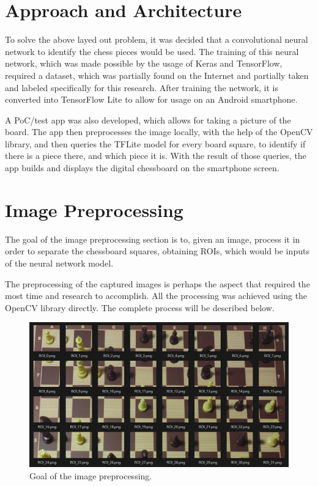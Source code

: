 \documentclass[10pt]{article}
\begin{document}
\pagebreak

\section{Approach and Architecture}\label{sec:2}

To solve the above layed out problem, it was decided that a convolutional neural network to identify the chess pieces would be used. The training of this neural network, which was made possible by the usage of Keras and TensorFlow, required a dataset, which was partially found on the Internet and partially taken and labeled specifically for this research. After training the network, it is converted into TensorFlow Lite to allow for usage on an Android smartphone.

A PoC/test app was also developed, which allows for taking a picture of the board. The app then preprocesses the image locally, with the help of the OpenCV library, and then queries the TFLite model for every board square, to identify if there is a piece there, and which piece it is. With the result of those queries, the app builds and displays the digital chessboard on the smartphone screen.

\section{Image Preprocessing}\label{sec:3}

The goal of the image preprocessing section is to, given an image, process it in order to separate the chessboard squares, obtaining ROIs, which would be inputs of the neural network model.

The preprocessing of the captured images is perhaps the aspect that required the most time and research to accomplish. All the processing was achieved using the OpenCV library directly. The complete process will be described below.

\begin{figure}[H]
	\centering
	\includegraphics[scale=0.4]{preprocessing-goal}
	\caption{Goal of the image preprocessing.}\label{fig:preprocessing-goal}
\end{figure}
\end{document}

